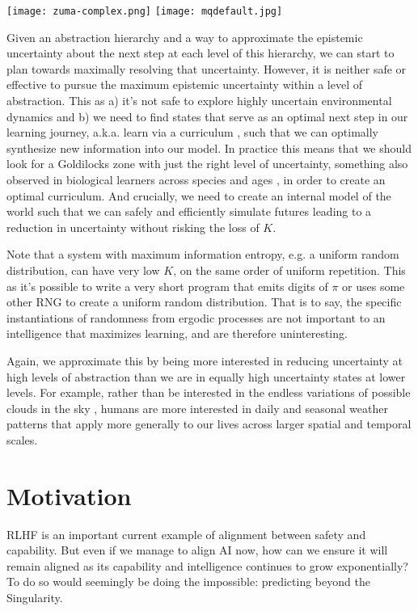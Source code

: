 \documentclass{article}
\begin{document}
\texttt{[image: zuma-complex.png]}
\texttt{[image: mqdefault.jpg]}

Given an abstraction hierarchy and a way to approximate the epistemic uncertainty about the next step at each level of this hierarchy, we can start to plan towards maximally resolving that uncertainty.  However, it is neither safe or effective to pursue the maximum epistemic uncertainty within a level of abstraction. This as a) it's not safe to explore highly uncertain environmental dynamics\cite{plappert2018multi} and b) we need to find states that serve as an optimal next step in our learning journey, a.k.a. learn via a curriculum \cite{bengio2009curriculum}, such that we can optimally synthesize new information into our model. In practice this means that we should look for a Goldilocks zone with just the right level of uncertainty, something also observed in biological learners across species and ages \cite{kidd2012goldilocks}, in order to create an optimal curriculum. And crucially, we need to create an internal model \cite{jang2023reflection} of the world such that we can safely and efficiently simulate futures leading to a reduction in uncertainty without risking the loss of $K$.

Note that a system with maximum information entropy, e.g. a uniform random distribution, can have very low $K$, on the same order of uniform repetition. This as it's possible to write a very short program that emits digits of $\pi$ or uses some other RNG to create a uniform random distribution.
That is to say, the specific instantiations of randomness from ergodic processes are not important to an intelligence that maximizes learning, and are therefore uninteresting.

Again, we approximate this by being more interested in reducing uncertainty at high levels of abstraction than we are in equally high uncertainty states at lower levels. For example, rather than be interested in the endless variations of possible clouds in the sky \cite{alex-graves-vid},
humans are more interested in daily and seasonal weather patterns that apply more generally to our lives across larger spatial and temporal scales.

\section{Motivation}
RLHF \cite{christiano2017deep}\cite{ouyang2022training} is an important current example of alignment between safety and capability. But even if we manage to align AI now, how can we ensure it will remain aligned as its capability and intelligence continues to grow exponentially?
To do so would seemingly be doing the impossible: predicting beyond the Singularity.
\end{document}

